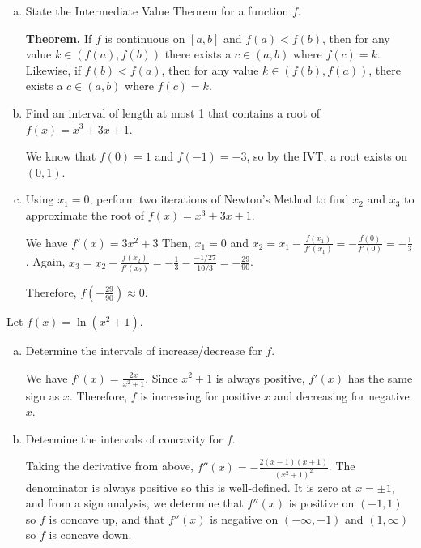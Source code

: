 \documentclass{agony}
\begin{document}
\begin{prob}
  \begin{enumerate}[(a)]
    \item State the Intermediate Value Theorem for a function $f$.

          \textbf{Theorem.} If $f$ is continuous on $[a,b]$ and $f(a) < f(b)$,
          then for any value $k\in(f(a),f(b))$ there exists a $c\in(a,b)$ where $f(c) = k$.
          Likewise, if $f(b) < f(a)$, then for any value $k\in(f(b),f(a))$,
          there exists a $c\in(a,b)$ where $f(c)=k$.

    \item Find an interval of length at most 1 that contains a root of $f(x) = x^3 + 3x + 1$.
          \begin{sol}
            We know that $f(0) = 1$ and $f(-1) = -3$, so by the IVT, a root exists on $(0,1)$.
          \end{sol}

    \item Using $x_1 = 0$, perform two iterations of Newton's Method to find $x_2$ and $x_3$
          to approximate the root of $f(x) = x^3 + 3x + 1$.
          \begin{sol}
            We have $f'(x) = 3x^2 + 3$
            Then, $x_1 = 0$ and $x_2 = x_1 - \frac{f(x_1)}{f'(x_1)} = -\frac{f(0)}{f'(0)} = -\frac13$.
            Again, $x_3 = x_2 - \frac{f(x_2)}{f'(x_2)} = -\frac13 - \frac{-1/27}{10/3} = -\frac{29}{90}$.

            Therefore, $f(-\frac{29}{90}) \approx 0$.
          \end{sol}
  \end{enumerate}
\end{prob}

\begin{prob}
  Let $f(x) = \ln(x^2+1)$.
  \begin{enumerate}[(a)]
    \item Determine the intervals of increase/decrease for $f$.
          \begin{sol}
            We have $f'(x) = \frac{2x}{x^2+1}$.
            Since $x^2+1$ is always positive, $f'(x)$ has the same sign as $x$.
            Therefore, $f$ is increasing for positive $x$ and decreasing for negative $x$.
          \end{sol}
    \item Determine the intervals of concavity for $f$.
          \begin{sol}
            Taking the derivative from above, $f''(x) = -\frac{2(x-1)(x+1)}{(x^2+1)^2}$.
            The denominator is always positive so this is well-defined.
            It is zero at $x = \pm 1$, and from a sign analysis,
            we determine that $f''(x)$ is positive on $(-1,1)$ so $f$ is concave up,
            and that $f''(x)$ is negative on $(-\infty,-1)$ and $(1,\infty)$ so $f$ is concave down.
          \end{sol}
  \end{enumerate}
\end{prob}
\end{document}
